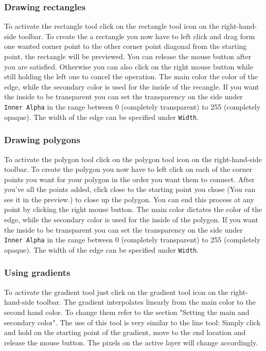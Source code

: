 \documentclass[a4paper, 12pt]{article}
\begin{document}
\subsubsection{Drawing rectangles}
To activate the rectangle tool click on the rectangle tool icon on the right-hand-side toolbar.
To create the a rectangle you now have to left click and drag form one wanted corner point to the other corner point diagonal from the starting point, the rectangle will be previewed. You can release the mouse button after you are satisfied.
Otherwise you can also click on the right mouse button while still holding the left one to cancel the operation.
The main color the color of the edge, while the secondary color is used for the inside of the recangle. If you want the inside to be transparent you can set the transparency on the side under \texttt{Inner Alpha} in the range between 0 (completely transparent) to 255 (completely opaque). The width of the edge can be specified under \texttt{Width}.

\subsubsection{Drawing polygons}
To activate the polygon tool click on the polygon tool icon on the right-hand-side toolbar.
To create the polygon you now have to left click on each of the corner points you want for your polygon in the order you want them to connect.
After you've all the points added, click close to the starting point you chose (You can see it in the preview.) to close up the polygon. You can end this process at any point by clicking the right mouse button.
The main color dictates the color of the edge, while the secondary color is used for the inside of the polygon. If you want the inside to be transparent you can set the transparency on the side under \texttt{Inner Alpha} in the range between 0 (completely transparent) to 255 (completely opaque). The width of the edge can be specified under \texttt{Width}.

\subsubsection{Using gradients}
To activate the gradient tool just click on the gradient tool icon on the right-hand-side toolbar. The gradient interpolates linearly from the main color to the second hand color. To change them refer to the section "Setting the main and secondary color".
The use of this tool is very similar to the line tool: Simply click and hold on the starting point of the gradient, move to the end location and release the mouse button. The pixels on the active layer will change accordingly.
\end{document}
